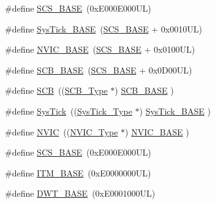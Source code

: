 \begin{DoxyCompactItemize}
\item 
\#define \hyperlink{group___c_m_s_i_s__core__base_ga3c14ed93192c8d9143322bbf77ebf770}{S\-C\-S\-\_\-\-B\-A\-S\-E}~(0x\-E000\-E000\-U\-L)
\item 
\#define \hyperlink{group___c_m_s_i_s__core__base_ga58effaac0b93006b756d33209e814646}{Sys\-Tick\-\_\-\-B\-A\-S\-E}~(\hyperlink{group___c_m_s_i_s__core__base_ga3c14ed93192c8d9143322bbf77ebf770}{S\-C\-S\-\_\-\-B\-A\-S\-E} +  0x0010\-U\-L)
\item 
\#define \hyperlink{group___c_m_s_i_s__core__base_gaa0288691785a5f868238e0468b39523d}{N\-V\-I\-C\-\_\-\-B\-A\-S\-E}~(\hyperlink{group___c_m_s_i_s__core__base_ga3c14ed93192c8d9143322bbf77ebf770}{S\-C\-S\-\_\-\-B\-A\-S\-E} +  0x0100\-U\-L)
\item 
\#define \hyperlink{group___c_m_s_i_s__core__base_gad55a7ddb8d4b2398b0c1cfec76c0d9fd}{S\-C\-B\-\_\-\-B\-A\-S\-E}~(\hyperlink{group___c_m_s_i_s__core__base_ga3c14ed93192c8d9143322bbf77ebf770}{S\-C\-S\-\_\-\-B\-A\-S\-E} +  0x0\-D00\-U\-L)
\item 
\#define \hyperlink{group___c_m_s_i_s__core__base_gaaaf6477c2bde2f00f99e3c2fd1060b01}{S\-C\-B}~((\hyperlink{struct_s_c_b___type}{S\-C\-B\-\_\-\-Type}       $\ast$)     \hyperlink{group___c_m_s_i_s__core__base_gad55a7ddb8d4b2398b0c1cfec76c0d9fd}{S\-C\-B\-\_\-\-B\-A\-S\-E}      )
\item 
\#define \hyperlink{group___c_m_s_i_s__core__base_gacd96c53beeaff8f603fcda425eb295de}{Sys\-Tick}~((\hyperlink{struct_sys_tick___type}{Sys\-Tick\-\_\-\-Type}   $\ast$)     \hyperlink{group___c_m_s_i_s__core__base_ga58effaac0b93006b756d33209e814646}{Sys\-Tick\-\_\-\-B\-A\-S\-E}  )
\item 
\#define \hyperlink{group___c_m_s_i_s__core__base_gac8e97e8ce56ae9f57da1363a937f8a17}{N\-V\-I\-C}~((\hyperlink{struct_n_v_i_c___type}{N\-V\-I\-C\-\_\-\-Type}      $\ast$)     \hyperlink{group___c_m_s_i_s__core__base_gaa0288691785a5f868238e0468b39523d}{N\-V\-I\-C\-\_\-\-B\-A\-S\-E}     )
\item 
\#define \hyperlink{group___c_m_s_i_s__core__base_ga3c14ed93192c8d9143322bbf77ebf770}{S\-C\-S\-\_\-\-B\-A\-S\-E}~(0x\-E000\-E000\-U\-L)
\item 
\#define \hyperlink{group___c_m_s_i_s__core__base_gadd76251e412a195ec0a8f47227a8359e}{I\-T\-M\-\_\-\-B\-A\-S\-E}~(0x\-E0000000\-U\-L)
\item 
\#define \hyperlink{group___c_m_s_i_s__core__base_gafdab534f961bf8935eb456cb7700dcd2}{D\-W\-T\-\_\-\-B\-A\-S\-E}~(0x\-E0001000\-U\-L)
\item 

\end{DoxyCompactItemize}
